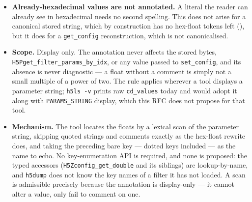 \documentclass[../RFC-HDFG-2026-001.tex]{subfiles}
\begin{document}
\begin{notebox}
\begin{itemize}
    itself; it does \emph{not} print \texttt{\%a} output verbatim.  C17
    \S7.21.6.1p8 requires only that a precision-free \texttt{\%a} be
    ``sufficient for an exact representation'' when \texttt{FLT\_RADIX} is a
    power of 2, and constrains the leading digit only to be nonzero for
    normalized values, so \texttt{0x1.8p-36},
    \texttt{0x1.8000000000000p-36}, and \texttt{0x3p-37} are all conforming
    renderings of one \texttt{double} --- glibc trims trailing zeros and the
    Microsoft CRT does not.  \texttt{h5dump} output is compared byte for
    byte against expected files, so the tool emits a canonical spelling: a
    normalized leading digit, trailing zeros of the fraction removed, the
    fraction and its decimal point omitted entirely when zero, lowercase
    \texttt{0x} and \texttt{p}, and a signed exponent.
  \item \textbf{Already-hexadecimal values are not annotated.}  A literal
    the reader can already see in hexadecimal needs no second spelling.
    This does not arise for a canonical stored string, which by
    construction has no hex-float tokens left
    (), but it does for a
    \texttt{get\_config} reconstruction, which is not canonicalised.
  \item \textbf{Scope.}  Display only.  The annotation never affects the
    stored bytes, \texttt{H5Pget\_filter\_params\_by\_idx}, or any value
    passed to \texttt{set\_config}, and its absence is never diagnostic ---
    a float without a comment is simply not a small multiple of a power of
    two.  The rule applies wherever a tool displays a parameter string;
    \texttt{h5ls~-v} prints raw \texttt{cd\_values} today and would adopt it
    along with \texttt{PARAMS\_STRING} display, which this RFC does not
    propose for that tool.
  \item \textbf{Mechanism.}  The tool locates the floats by a lexical scan
    of the parameter string, skipping quoted strings and comments exactly as
    the hex-float rewrite does, and taking the preceding bare key --- dotted
    keys included --- as the name to echo.  No key-enumeration API is
    required, and none is proposed: the typed accessors
    (\texttt{H5Zconfig\_get\_double} and its siblings) are lookup-by-name,
    and \texttt{h5dump} does not know the key names of a filter it has not
    loaded.  A scan is admissible precisely because the annotation is
    display-only --- it cannot alter a value, only fail to comment on one.
\end{itemize}
\end{notebox}
\end{document}
